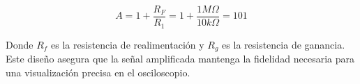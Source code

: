                 \begin{equation}
                    \label{eq:ganancia_amplificador_no_inversor}
                    A = 1 + \frac{R_F}{R_{1}} = 1 + \frac{1 M\Omega}{10 k\Omega} = 101
                \end{equation}

                Donde $R_f$ es la resistencia de realimentación y $R_g$ es la resistencia de ganancia. Este diseño asegura que la señal amplificada mantenga la fidelidad necesaria para una visualización precisa en el osciloscopio.